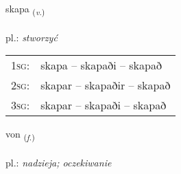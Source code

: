 \documentclass[frontgrid, backgrid]{flacards}\usepackage[]{graphicx}\usepackage[]{xcolor}
\begin{document}
\renewcommand{\flhead}{\vskip5pt \fboxsep=0pt {\small\bfseries\footnotesize Sagnorð | czasownik}}
\renewcommand{\fcfoot}{\vskip5pt \fboxsep=0pt \hspace{2pt}{\small\bfseries\footnotesize 1K}}

\renewcommand{\blhead}{\vskip5pt {\small\bfseries\footnotesize Sagnorð | czasownik }}
\renewcommand{\bcfoot}{\vskip5pt \hspace{2pt}{\small\bfseries\footnotesize 1K}}


{skapa \small{\textsubscript{(\textit{v.})}} \\[1ex] %
\textphonetic{[skaːpa]} \\
pl.: \emph{stworzyć} \\  [2ex]
\renewcommand*{\arraystretch}{0.8}
\begin{tabular}{p{1cm}l}
\textsc{1sg}: & skapa -- skapaði -- skapað \\ 
\textsc{2sg}: & skapar -- skapaðir -- skapað \\ 
\textsc{3sg}: & skapar -- skapaði -- skapað \\ 
\end{tabular}
}

\renewcommand{\flhead}{\vskip5pt \fboxsep=0pt {\small\bfseries\footnotesize Nafnorð | rzeczownik}}
\renewcommand{\fcfoot}{\vskip5pt \fboxsep=0pt \hspace{2pt}{\small\bfseries\footnotesize 1K}}

\renewcommand{\blhead}{\vskip5pt {\small\bfseries\footnotesize Nafnorð | rzeczownik }}
\renewcommand{\bcfoot}{\vskip5pt \hspace{2pt}{\small\bfseries\footnotesize 1K}}


{von \small{\textsubscript{(\textit{f.})}} \\[1ex] %
\textphonetic{[vɔːn]} \\
pl.: \emph{nadzieja; oczekiwanie} \\  [2ex]
\renewcommand*{\arraystretch}{0.8}
}
\end{document}
